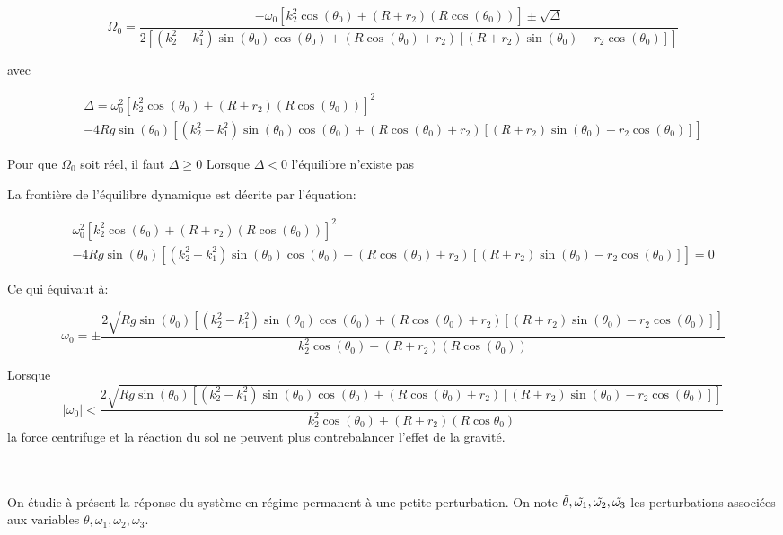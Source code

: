 \begin{equation}
 \Omega_0=\frac{-\omega_0[k_2^2 \cos(\theta_0)+(R+r_2)(R \cos(\theta_0))] \pm \sqrt{\Delta} }{2[(k_2^2-k_1^2)\sin(\theta_0)\cos(\theta_0)+(R \cos(\theta_0)+r_2)[(R+r_2)\sin(\theta_0)-r_2 \cos(\theta_0)]]}
  \label{eq:b13}
\end{equation}

avec 

\begin{equation}
 \begin{split}
 \Delta=\omega_0^2[k_2^2 \cos(\theta_0)+(R+r_2)(R \cos(\theta_0))]^2 \\
 -4 R g \sin(\theta_0)[(k_2^2-k_1^2)\sin(\theta_0)\cos(\theta_0)+(R \cos(\theta_0)+r_2)[(R+r_2)\sin(\theta_0)-r_2 \cos(\theta_0)]]
 \end{split}
  \label{eq:b14}
\end{equation}

Pour que $\Omega_0$ soit réel, il faut $\Delta \geq 0$
Lorsque $\Delta < 0$ l'équilibre n'existe pas

La frontière de l'équilibre dynamique est décrite par l'équation:

\begin{equation}
 \begin{split}
 \omega_0^2[k_2^2 \cos(\theta_0)+(R+r_2)(R \cos(\theta_0))]^2 \\
 -4 R g \sin(\theta_0)[(k_2^2-k_1^2)\sin(\theta_0)\cos(\theta_0)+(R \cos(\theta_0)+r_2)[(R+r_2)\sin(\theta_0)-r_2 \cos(\theta_0)]] = 0
 \end{split}
  \label{eq:b15}
\end{equation}

Ce qui équivaut à:

\begin{equation}
 \omega_0= \pm \frac{2\sqrt{R g \sin(\theta_0)[(k_2^2-k_1^2)\sin(\theta_0)\cos(\theta_0)+(R \cos(\theta_0)+r_2)[(R+r_2)\sin(\theta_0)-r_2 \cos(\theta_0)]]}}{k_2^2 \cos(\theta_0)+(R+r_2)(R \cos(\theta_0))}
  \label{eq:b16}
\end{equation}

Lorsque $$ |\omega_0| < \frac{2\sqrt{R g \sin(\theta_0)[(k_2^2-k_1^2)\sin(\theta_0)\cos(\theta_0)+(R \cos(\theta_0)+r_2)[(R+r_2)\sin(\theta_0)-r_2 \cos(\theta_0)]]}}{k_2^2 \cos(\theta_0)+(R+r_2)(R \cos{\theta_0})}
$$
 la force centrifuge et la réaction du sol ne peuvent plus contrebalancer l'effet de la gravité.
 
 \\
 \\
On étudie à présent la réponse du système en régime permanent à une petite perturbation. On note $\Tilde{\theta}, \Tilde{\omega_1}, \Tilde{\omega_2}, \Tilde{\omega_3}$ les perturbations associées aux variables $\theta, \omega_1, \omega_2, \omega_3$. \\

